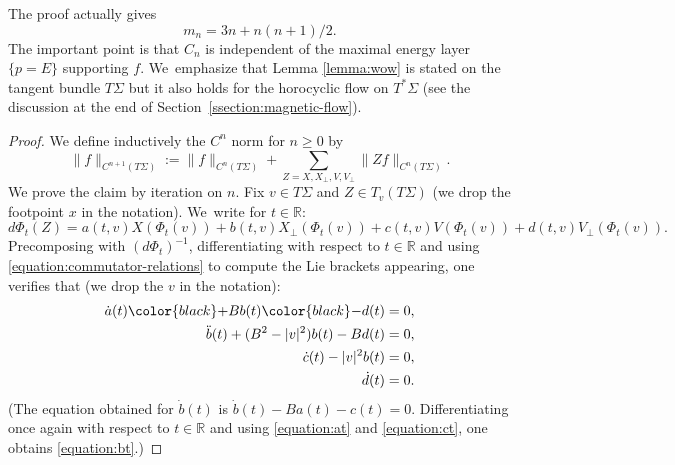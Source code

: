 \documentclass[10pt]{amsart}
\theoremstyle{plain}
\theoremstyle{definition}
\newcommand{\R}{\mathbb{R}}
\begin{document}
The proof actually gives
\[
m_n = 3n + n(n+1)/2.
\]
The important point is that $C_n$ is independent of the maximal energy layer $\{p=E\}$ supporting $f$. We~emphasize that Lemma \ref{lemma:wow} is stated on the tangent bundle $T\Sigma$ but it also holds for the horocyclic flow on $T^*\Sigma$ (see the discussion at the end of Section~\ref{ssection:magnetic-flow}).

\begin{proof}
We define inductively the $C^n$ norm for $n \geq 0$ by
\begin{equation}
\label{equation:definition-cn}
\|f\|_{C^{n+1}(T\Sigma)} := \|f\|_{C^n(T\Sigma)} + \sum_{Z = X,X_\perp,V,V_\perp} \|Zf\|_{C^n(T\Sigma)}.
\end{equation}
We prove the claim by iteration on $n$. Fix $v \in T\Sigma$ and $Z \in T_{v}(T\Sigma)$ (we drop the footpoint $x$ in the notation). We~write for $t \in \R$:
\[
d\Phi_t(Z) = a(t,v) X(\Phi_t(v)) + b(t,v) X_\perp(\Phi_t(v)) + c(t,v) V(\Phi_t(v)) + d(t,v) V_\perp(\Phi_t(v)).
\]
Precomposing with $(d\Phi_t)^{-1} $, differentiating with respect to $t \in \R$ and using \eqref{equation:commutator-relations} to compute the Lie brackets appearing, one verifies that (we drop the $v$ in the notation):
\begin{align}
\label{equation:at} \dot{a}(t) {\color{black}+} B b(t) {\color{black}-} d(t) &= 0, \\
\label{equation:bt} \ddot{b}(t)+(B^2-|v|^2)b(t)-Bd(t)&=0, \\
\label{equation:ct} \dot{c}(t)-|v|^2b(t)&=0, \\
\label{equation:dt} \dot{d}(t) &= 0.
\end{align}
(The equation obtained for $\dot{b}(t)$ is $\dot{b}(t) - Ba(t)-c(t) = 0$. Differentiating once again with respect to $t \in \R$ and using \eqref{equation:at} and \eqref{equation:ct}, one obtains \eqref{equation:bt}.)


\end{proof}
\end{document}

